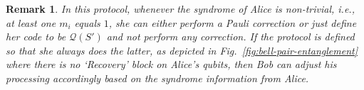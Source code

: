 \documentclass[journal,onecolumn]{IEEEtran}
\newtheorem{remark}[theorem]{Remark}
\newif\ifnotes
\newcommand{\narayanan}[1]{\ifnotes{{\color{blue} [Narayanan: #1]}}\fi}
\newcommand{\bane}[1]{\ifnotes{{\color{dkgreen} [Bane: #1]}}\fi}
\begin{document}
\begin{remark}
\normalfont
In this protocol, whenever the syndrome of Alice is non-trivial, i.e., at least one $m_i$ equals $1$, she can either perform a Pauli correction or just define her code to be $\mathcal{Q}(S')$ and not perform any correction.
If the protocol is defined so that she always does the latter, as depicted in Fig.~\ref{fig:bell-pair-entanglement} where there is no `Recovery' block on Alice's qubits, then Bob can adjust his processing accordingly based on the syndrome information from Alice.
\end{remark}


\end{document}
